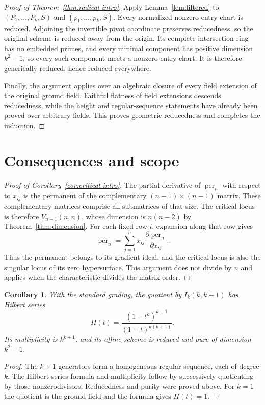 \documentclass[11pt]{article}
\newtheorem{corollary}[theorem]{Corollary}
\theoremstyle{remark}
\DeclareMathOperator{\per}{per}
\numberwithin{equation}{section}
\begin{document}
\begin{proof}[Proof of Theorem~\ref{thm:radical-intro}]
Apply Lemma~\ref{lem:filtered} to
$(P_1,\ldots,P_k,S)$ and $(p_1,\ldots,p_k,S)$.
Every normalized nonzero-entry chart is reduced. Adjoining the
invertible pivot coordinate preserves reducedness, so the original
scheme is reduced away from the origin. Its complete-intersection
ring has no embedded primes, and every minimal component has positive
dimension $k^2-1$, so every such component meets a nonzero-entry
chart. It is therefore generically reduced, hence reduced everywhere.

Finally, the argument applies over an algebraic closure of every
field extension of the original ground field. Faithful flatness of
field extensions descends reducedness, while the height and
regular-sequence statements have already been proved over arbitrary
fields. This proves geometric reducedness and completes the induction.
\end{proof}

\section{Consequences and scope}\label{sec:consequences}

\begin{proof}[Proof of Corollary~\ref{cor:critical-intro}]
The partial derivative of $\per_n$ with respect to $x_{ij}$ is the
permanent of the complementary $(n-1)\times(n-1)$ matrix.
These complementary matrices comprise all submatrices of that size.
The critical locus is therefore $V_{n-1}(n,n)$, whose dimension is
$n(n-2)$ by Theorem~\ref{thm:dimension}.
For each fixed row $i$, expansion along that row gives
\[
 \per_n=\sum_{j=1}^n x_{ij}\frac{\partial\per_n}{\partial x_{ij}}.
\]
Thus the permanent belongs to its gradient ideal, and the critical
locus is also the singular locus of its zero hypersurface. This
argument does not divide by $n$ and applies when the characteristic
divides the matrix order.
\end{proof}

\begin{corollary}\label{cor:hilbert}
With the standard grading, the quotient by $I_k(k,k+1)$ has Hilbert
series
\[
 H(t)=\frac{(1-t^k)^{k+1}}{(1-t)^{k(k+1)}}.
\]
Its multiplicity is $k^{k+1}$, and its affine scheme is reduced
and pure of dimension $k^2-1$.
\end{corollary}

\begin{proof}
The $k+1$ generators form a homogeneous regular sequence, each of
degree $k$. The Hilbert-series formula and multiplicity follow by
successively quotienting by those nonzerodivisors. Reducedness and
purity were proved above. For $k=1$ the quotient is the ground field
and the formula gives $H(t)=1$.
\end{proof}
\end{document}
